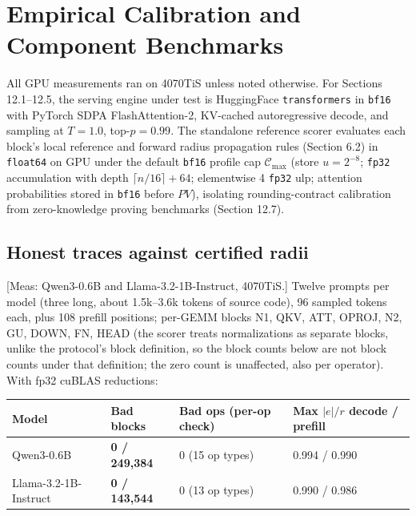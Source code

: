 \documentclass[10pt]{article}
\begin{document}
\section{Empirical Calibration and Component Benchmarks}
All GPU measurements ran on 4070TiS unless noted otherwise. For Sections 12.1--12.5, the serving engine under test is HuggingFace \texttt{transformers} in \texttt{bf16} with PyTorch SDPA FlashAttention-2, KV-cached autoregressive decode, and sampling at $T=1.0$, top-$p=0.99$. The standalone reference scorer evaluates each block's local reference and forward radius propagation rules (Section 6.2) in \texttt{float64} on GPU under the default \texttt{bf16} profile cap $\mathcal C_{\max}$ (store $u=2^{-8}$; \texttt{fp32} accumulation with depth $\lceil n/16\rceil+64$; elementwise 4 \texttt{fp32} ulp; attention probabilities stored in \texttt{bf16} before $PV$), isolating rounding-contract calibration from zero-knowledge proving benchmarks (Section 12.7).

\subsection{Honest traces against certified radii}
[Meas: Qwen3-0.6B and Llama-3.2-1B-Instruct, 4070TiS.] Twelve prompts per model (three long, about 1.5k--3.6k tokens of source code), 96 sampled tokens each, plus 108 prefill positions; per-GEMM blocks N1, QKV, ATT, OPROJ, N2, GU, DOWN, FN, HEAD (the scorer treats normalizations as separate blocks, unlike the protocol's block definition, so the block counts below are not block counts under that definition; the zero count is unaffected, also per operator). With fp32 cuBLAS reductions:

\begin{center}\small
\begin{tabularx}{\linewidth}{YYYY}
\toprule
{}\textbf{Model} & {}\textbf{Bad blocks} & {}\textbf{Bad ops (per-op check)} & {}\textbf{Max $\lvert e\rvert/r$ decode / prefill} \\
\midrule
{}Qwen3-0.6B & {}\textbf{0 / 249,384} & {}0 (15 op types) & {}0.994 / 0.990 \\
{}Llama-3.2-1B-Instruct & {}\textbf{0 / 143,544} & {}0 (13 op types) & {}0.990 / 0.986 \\
\bottomrule
\end{tabularx}
\end{center}
\end{document}
